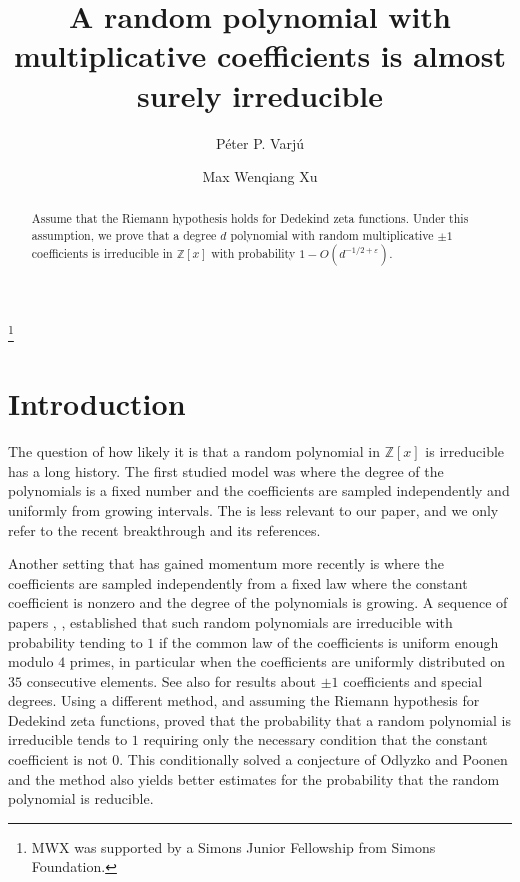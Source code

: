 \documentclass[12pt, notitlepage]{amsart}
\numberwithin{equation}{section}
\def\Z{\mathbb Z}
\theoremstyle{remark}
\theoremstyle{definition}
\theoremstyle{remark}
\numberwithin{equation}{section}
\newcommand{\e}{\varepsilon}
\begin{document}
	\title[Random polynomials with multiplicative coefficients]{A random polynomial with multiplicative coefficients is almost surely irreducible}
   \author{P\'eter P. Varj\'u}
\address{Centre for Mathematical Sciences, Wilberforce Road, Cambridge CB3 0WA, UK}
	\author{Max Wenqiang Xu}
\thanks{MWX was supported by a Simons Junior Fellowship from Simons Foundation.}
\address{Yau Mathematical Sciences Center, Tsinghua University, Beijing, China}

	\begin{abstract}
		Assume that the Riemann hypothesis holds for Dedekind zeta functions.
Under this assumption,
we prove that a degree $d$ polynomial with random multiplicative $\pm1$ coefficients is
irreducible in $\Z[x]$ with probability $1-O(d^{-1/2+\e})$.
	\end{abstract}
	\maketitle

 \section{Introduction}


The question of how likely it is that a random polynomial in $\Z[x]$
is irreducible has a long history.
The first studied model was where the degree of the polynomials is a fixed
number and the coefficients are sampled independently and uniformly from
growing intervals.
The is less relevant to our paper, and we only refer to the recent
breakthrough \cite{Bha} and its references.

Another setting that has gained momentum more recently is where the
coefficients are sampled independently from a fixed law where the constant coefficient is nonzero and the degree
of the polynomials is growing.
A sequence of papers \cite{BSK}, \cite{BSKK}, \cite{Baz} established that such random polynomials are irreducible
with probability tending to $1$ if the common law of the coefficients
is uniform enough modulo $4$ primes, in particular when the coefficients are
uniformly distributed on $35$ consecutive elements.
See also \cite{BSHKP} for results about $\pm1$ coefficients and special degrees.
Using a different method, and assuming the Riemann hypothesis for Dedekind zeta
functions, \cite{BV19} proved that the probability that a random polynomial is
irreducible tends to $1$ requiring only the necessary condition that the constant
coefficient is not $0$.
This conditionally solved a conjecture of Odlyzko and Poonen \cite{OP93} and the method also yields better estimates for the probability that the
random polynomial is reducible.
\end{document}
